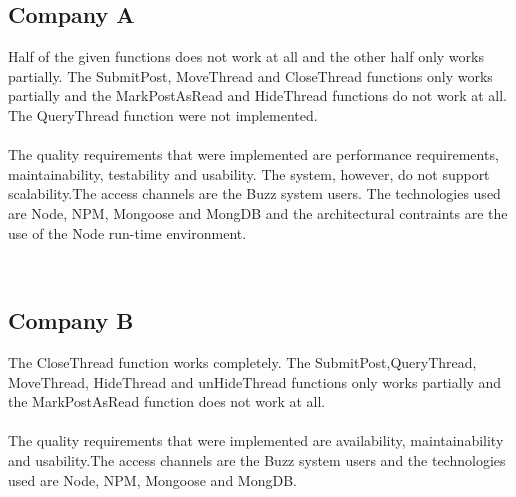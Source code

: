 \subsection{Company A}
\begin{flushleft}
Half of the given functions does not work at all and the other half only works partially. The SubmitPost, MoveThread and CloseThread functions only works partially and the MarkPostAsRead and HideThread  functions do not work at all. The QueryThread function were not implemented. \\
\\
The quality requirements that were implemented are performance requirements, maintainability, testability and usability. The system, however, do not support scalability.The access channels are the Buzz system users. The technologies used are Node, NPM, Mongoose and MongDB and the architectural contraints are the use of the Node run-time environment.


\end{flushleft}
\\

\subsection{Company B}
\begin{flushleft}
The CloseThread function works completely. The SubmitPost,QueryThread, MoveThread, HideThread and unHideThread functions only works partially and the MarkPostAsRead function does not work at all.   \\
\\
The quality requirements that were implemented are availability, maintainability and usability.The access channels are the Buzz system users and the technologies used are Node, NPM, Mongoose and MongDB.
\end{flushleft}

